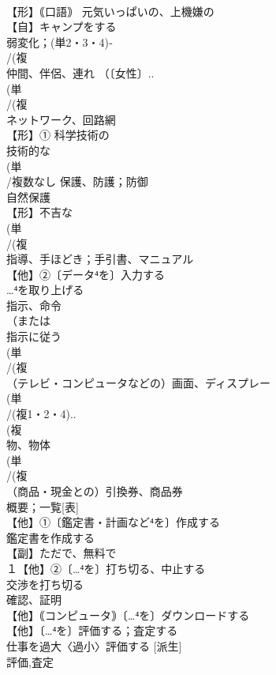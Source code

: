 \documentclass[8pt]{extreport}
\begin{document}
\begin{CJK}{UTF8}{min}
\\	【形】｟口語｠ 元気いっぱいの、上機嫌の 
\\	【自】キャンプをする 
\\	弱変化；(単2・3・4)‐
\\	/(複
\\	仲間、伴侶、連れ （〔女性〕..
\\	(単
\\	/(複
\\	ネットワーク、回路網 
\\	【形】① 科学技術の　
\\	技術的な
\\	(単
\\	/複数なし 保護、防護；防御 
\\	自然保護
\\	【形】不吉な 
\\	(単
\\	/(複
\\	指導、手ほどき；手引書、マニュアル 
\\	【他】②〔データ⁴を〕入力する 
\\	…⁴を取り上げる
\\	指示、命令 
\\	（または
\\	指示に従う
\\	(単
\\	/(複
\\	（テレビ・コンピュータなどの）画面、ディスプレー 
\\	(単
\\	/(複1・2・4)..
\\	(複
\\	物、物体 
\\	(単
\\	/(複
\\	（商品・現金との）引換券、商品券 
\\	概要；一覧[表]
\\	【他】①〔鑑定書・計画など⁴を〕作成する 
\\	鑑定書を作成する 
\\	【副】ただで、無料で 
\\	１【他】②〔…⁴を〕打ち切る、中止する 
\\	交渉を打ち切る
\\	確認、証明 
\\	【他】｟コンピュータ｠〔…⁴を〕ダウンロードする 
\\	【他】〔…⁴を〕評価する；査定する 
\\	仕事を過大〈過小〉評価する [派生] 
\\	評価,査定

\end{CJK}
\end{document}
